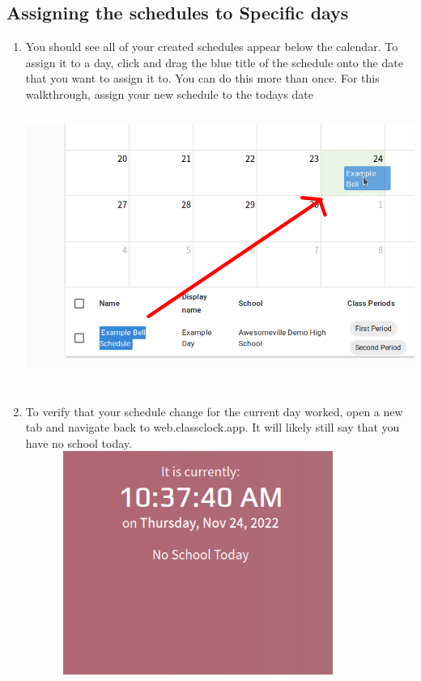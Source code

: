 \documentclass{article}
\begin{document}
\clearpage\subsection{Assigning the schedules to Specific days}
\begin{enumerate}
\item {You should see all of your created schedules appear below the calendar. To assign it to a day, click and drag the blue
title of the schedule onto the date that you want to assign it to. You can do this more than once. For this
walkthrough, assign your new schedule to the todays date\newline
}
\includegraphics[width=6.5in,height=3.6807in]{Mini20Manual-img012.png}
\item {To verify that your schedule change for the current day worked, open a new tab and navigate back to web.classclock.app.
It will likely still say that you have no school today.}
\includegraphics[width=4.4366in,height=2.8764in]{Mini20Manual-img013.png}

\end{enumerate}
\end{document}
